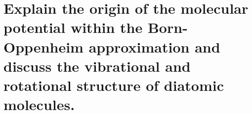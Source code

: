 \section{Explain the origin of the molecular potential within the Born-Oppenheim approximation and discuss the vibrational and rotational structure of diatomic molecules.}

\huge

\normalsize